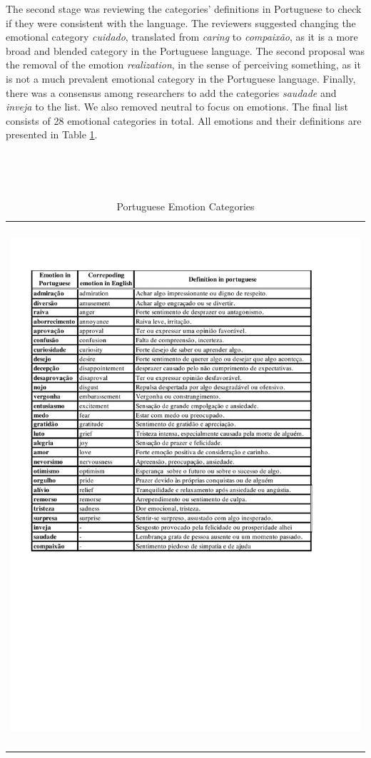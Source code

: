 \documentclass[12pt]{article}
\begin{document}
The second stage was reviewing the categories' definitions in Portuguese to check if they were consistent with the language. The reviewers suggested changing the emotional category \textit{cuidado}, translated from \textit{caring} to \textit{compaixão}, as it is a more broad and blended category in the Portuguese language. The second proposal was the removal of the emotion \textit{realization}, in the sense of perceiving something, as it is not a much prevalent emotional category in the Portuguese language. Finally, there was a consensus among researchers to add the categories \textit{saudade} and \textit{inveja} to the list. We also removed neutral to focus on emotions. The final list consists of 28 emotional categories in total. All emotions and their definitions are presented in Table \ref{tab:emotion-categories}.

\begin{table}[ht]
  \caption{Portuguese Emotion Categories}
  \label{tab:emotion-categories}
  \begin{tabularx}{\textwidth}{X}
    \centering
    \includegraphics[trim=1.2cm 10.7cm 2.2cm 1.5cm, clip, scale=0.7]{img-n-tables/EMOCOES}
  \end{tabularx}
\end{table}
\end{document}
